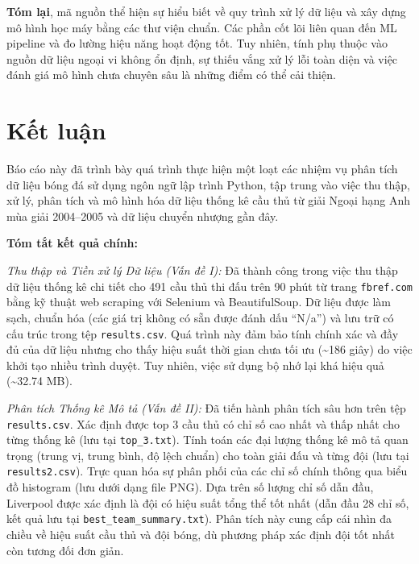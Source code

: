 \documentclass[12pt]{report}
\begin{document}
{\textbf{Tóm lại}, mã nguồn thể hiện sự hiểu biết về quy trình xử lý dữ liệu và xây dựng mô hình học máy bằng các thư viện chuẩn. Các phần cốt lõi liên quan đến ML pipeline và đo lường hiệu năng hoạt động tốt. Tuy nhiên, tính phụ thuộc vào nguồn dữ liệu ngoại vi không ổn định, sự thiếu vắng xử lý lỗi toàn diện và việc đánh giá mô hình chưa chuyên sâu là những điểm có thể cải thiện.
}

\chapter*{Kết luận}
{
\noindent
Báo cáo này đã trình bày quá trình thực hiện một loạt các nhiệm vụ phân tích dữ liệu bóng đá sử dụng ngôn ngữ lập trình Python, tập trung vào việc thu thập, xử lý, phân tích và mô hình hóa dữ liệu thống kê cầu thủ từ giải Ngoại hạng Anh mùa giải 2004--2005 và dữ liệu chuyển nhượng gần đây.

\vspace{1em}
\noindent
\textbf{Tóm tắt kết quả chính:}

\vspace{0.5em}
\noindent
\textit{Thu thập và Tiền xử lý Dữ liệu (Vấn đề I):} Đã thành công trong việc thu thập dữ liệu thống kê chi tiết cho 491 cầu thủ thi đấu trên 90 phút từ trang \texttt{fbref.com} bằng kỹ thuật web scraping với Selenium và BeautifulSoup. Dữ liệu được làm sạch, chuẩn hóa (các giá trị không có sẵn được đánh dấu ``N/a'') và lưu trữ có cấu trúc trong tệp \texttt{results.csv}. Quá trình này đảm bảo tính chính xác và đầy đủ của dữ liệu nhưng cho thấy hiệu suất thời gian chưa tối ưu (\textasciitilde186 giây) do việc khởi tạo nhiều trình duyệt. Tuy nhiên, việc sử dụng bộ nhớ lại khá hiệu quả (\textasciitilde32.74 MB).

\vspace{0.5em}
\noindent
\textit{Phân tích Thống kê Mô tả (Vấn đề II):} Đã tiến hành phân tích sâu hơn trên tệp \texttt{results.csv}. Xác định được top 3 cầu thủ có chỉ số cao nhất và thấp nhất cho từng thống kê (lưu tại \texttt{top\_3.txt}). Tính toán các đại lượng thống kê mô tả quan trọng (trung vị, trung bình, độ lệch chuẩn) cho toàn giải đấu và từng đội (lưu tại \texttt{results2.csv}). Trực quan hóa sự phân phối của các chỉ số chính thông qua biểu đồ histogram (lưu dưới dạng file PNG). Dựa trên số lượng chỉ số dẫn đầu, Liverpool được xác định là đội có hiệu suất tổng thể tốt nhất (dẫn đầu 28 chỉ số, kết quả lưu tại \texttt{best\_team\_summary.txt}). Phân tích này cung cấp cái nhìn đa chiều về hiệu suất cầu thủ và đội bóng, dù phương pháp xác định đội tốt nhất còn tương đối đơn giản.

}
\end{document}

